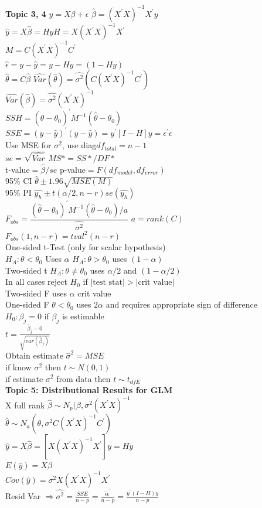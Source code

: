 \documentclass[10pt,landscape]{article}
\newcommand{\B}{\beta}
\newcommand{\sg}{\sigma}
\newcommand{\hb}{\hat{\beta}}
\newcommand{\hth}{\hat{\theta}}
\newcommand{\ta}{\theta}
\newcommand{\ra}{\Rightarrow}
\newcommand{\xxx}{X(X^{\prime}X)^{-1}X^{\prime}}
\newcommand{\xx}{(X^{\prime}X)^{-1}}
\newcommand{\m}{C\xx C^{\prime}}
\newcommand{\p}{\prime}
\newcommand{\hy}{\hat{y}}
\newcommand{\st}{\sg^2}
\newcommand{\sh}{\hat{\sg^2}}
\newcommand{\eh}{\hat{\epsilon}}
\begin{document}
\begin{multicols*}{4}
\textbf{Topic 3, 4}
$y=X\B+\epsilon$ \quad
$\hb=(X^{'}X)^{-1}X^{'}y$\\
$\hat{y}=X\hb=Hy$\quad $H=X(X^{'}X)^{-1}X^{'}$\\
$M=C(X^{'}X)^{-1}C^{'}$\\
$\hat{\epsilon}=y-\hat{y}=y-Hy=(1-Hy)$\\
$\hth=C\hb$ \quad $\hat{Var}(\hth)=\hat{\sg^2}(C(X^{'}X)^{-1}C^{'})$\\
$\hat{Var}(\hb)=\hat{\sg^2}(X^{'}X)^{-1}$ \\
$SSH=(\hth-\theta_0)^{'}M^{-1}(\hth-\theta_0)$\\
$SSE=(y-\hat{y})^{'}(y-\hat{y})=y^{'}[I-H]y=\epsilon^{\prime}\epsilon$\\
Use MSE for $\hat{\sg^2}$, use diag\quad $df_{total}=n-1$\\
$se=\sqrt{\hat{Var}}$\quad
$MS*=SS*/DF*$\\
t-value$=\hb/se$\quad
p-value$=F(df_{model},df_{error})$\\
95\% CI  $\hth\pm 1.96\sqrt{MSE(M)}$\\
95\% PI $\hat{y_h}\pm t(\alpha/2,n-r)se(\hat{y_h})$\\
$F_{obs}=\dfrac{(\hth-\theta_0)^{'}M^{-1}(\hth-\theta_0)/a}{\hat{\sg^2}}$ $a=rank(C)$\\
$F_{obs}(1,n-r)=tval^2(n-r)$\\
One-sided t-Test (only for scalar hypothesis)\\
$H_A:\ta<\ta_0$ Uses $\alpha$ $H_A:\ta>\ta_0$ uses $(1-\alpha)$\\
Two-sided t $H_A:\ta\neq \ta_0$ uses $\alpha/2$ and $(1-\alpha/2)$\\
In all cases reject $H_0$ if $|\text{test stat}|>|\text{crit value}|$\\
Two-sided F uses $\alpha$ crit value\\
One-sided F $\ta<\ta_0$ uses $2\alpha$ and requires appropriate sign of difference\\
$H_0:\B_j=0$ if $\B_j$ is estimable\\
$t=\frac{\hb_j-0}{\sqrt{var(\hb_j)}}$\\
Obtain estimate $\hat{\sg}^2=MSE$\\
if know $\sigma^2$  then $t\sim N(0,1)$\\
if estimate $\sg^2$ from data then $t\sim t_{dfE}$\\


\textbf{Topic 5: Distributional Results for GLM}\\
X full rank $\hb \sim N_p(\B,\sg^2\xx$\\
$\hth \sim N_a(\ta,\sg^2\m)$\\
$\hat{y}=X\hb=[\xxx]y=Hy$\\
$E(\hat{y})=X\B$\\
$Cov(\hy)=\st \xxx$\\
Resid Var $\ra \sh=\frac{SSE}{n-p}=\frac{\eh \eh^{\p}}{n-p}=\frac{y^{\p}(I-H)y}{n-p}$\\



\end{multicols*}
\end{document}
